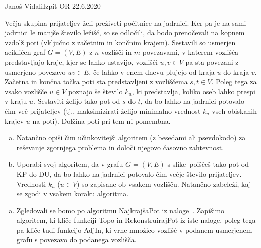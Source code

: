 \begin{naloga}{Janoš Vidali}{Izpit OR 22.6.2020}
\begin{vprasanje}
Večja skupina prijateljev želi preživeti počitnice na jadrnici.
Ker pa je na sami jadrnici le manjše število ležišč,
so se odločili, da bodo prenočevali na kopnem vzdolž poti
(vključno z začetnim in končnim krajem).
Sestavili so usmerjen acikličen graf $G = (V, E)$
z $n$ vozlišči in $m$ povezavami,
v katerem vozlišča predstavljajo kraje, kjer se lahko ustavijo,
vozlišči $u, v \in V$ pa sta povezani z usmerjeno povezavo $uv \in E$,
če lahko v enem dnevu plujejo od kraja $u$ do kraja $v$.
Začetna in končna točka poti sta predstavljeni z vozliščema $s, t \in V$.
Poleg tega za vsako vozlišče $u \in V$ poznajo še število $k_u$,
ki predstavlja, koliko oseb lahko prespi v kraju $u$.
Sestaviti želijo tako pot od $s$ do $t$,
da bo lahko na jadrnici potovalo čim več prijateljev
(tj., maksimizirati želijo minimalno vrednost $k_u$
vseh obiskanih krajev $u$ na poti).
Dolžina poti pri tem ni pomembna.

\begin{enumerate}[(a)]
\item Natančno opiši čim učinkovitejši algoritem (z besedami ali psevdokodo)
za reševanje zgornjega problema
in določi njegovo časovno zahtevnost.
\item Uporabi svoj algoritem,
da v grafu $G = (V, E)$ s slike~\fig poiščeš tako pot od KP do DU,
da bo lahko na jadrnici potovalo čim večje število prijateljev.
Vrednosti $k_u$ ($u \in V$) so zapisane ob vsakem vozlišču.
Natančno zabeleži, kaj se zgodi v vsakem koraku algoritma.
\end{enumerate}

\begin{slika}
\pgfslika
{}
\end{slika}
\end{vprasanje}

\begin{odgovor}
\begin{enumerate}[(a)]
\item Zgledovali se bomo po algoritmu {\sc NajkrajšaPot} iz naloge~\res[topo].
Zapišimo algoritem,
ki kliče funkciji {\sc Topo} in {\sc RekonstruirajPot} iz iste naloge,
poleg tega pa kliče tudi funkcijo {\sc AdjIn},
ki vrne množico vozlišč v podanem usmerjenem grafu
s povezavo do podanega vozlišča.


\end{enumerate}
\end{odgovor}
\end{naloga}
